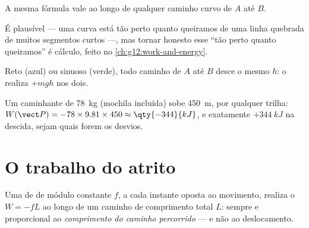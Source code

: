 \begin{proposition}\label{prop:g11:work-of-force:anypath}
A mesma fórmula vale ao longo de qualquer caminho curvo de $A$ até $B$.
\end{proposition}
\admitted

\begin{remark}\label{rem:g11:work-of-force:anypath}
É plausível --- uma curva está tão perto quanto queiramos de uma linha
quebrada de muitos segmentos curtos ---, mas tornar honesto esse ``tão
perto quanto queiramos'' é cálculo, feito no
\cref{ch:g12:work-and-energy}.
\end{remark}

\begin{omfigure}

{\small Reto (azul) ou sinuoso (verde), todo caminho de $A$ até $B$ desce
o mesmo $h$: o  realiza $+mgh$ nos dois.}
\end{omfigure}

\begin{example}[Caminhante]\label{ex:g11:work-of-force:hiker}
Um caminhante de \qty{78}{kg} (mochila incluída) sobe \qty{450}{m}, por
qualquer trilha: $W(\vect P) = -78 \times 9.81 \times 450 \approx
\qty{-344}{kJ}$, e exatamente $+\qty{344}{kJ}$ na descida, sejam quais
forem os desvios.
\end{example}

\section{O trabalho do atrito}

\begin{proposition}\label{prop:g11:work-of-force:friction}
Uma  de  de módulo constante $f$, a cada instante oposta ao
movimento, realiza o  $W = -fL$ ao longo de um caminho de
comprimento total $L$: sempre  e proporcional ao
\emph{comprimento do caminho percorrido} --- e não ao deslocamento.
\end{proposition}

